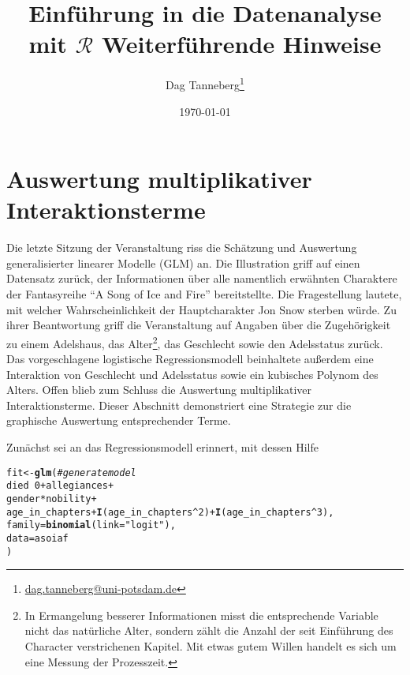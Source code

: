 \documentclass{article}\usepackage[]{graphicx}\usepackage[]{color}
\title{Einführung in die Datenanalyse mit $\mathcal{R}$\newline%
  Weiterführende Hinweise%
}
\author{
  Dag Tanneberg\thanks{
    \href{mailto:dag.tanneberg@uni-potsdam.de}{dag.tanneberg@uni-potsdam.de}
  }
}
\date{\today}
\makeatletter
\newcommand{\hlnum}[1]{\textcolor[rgb]{0.686,0.059,0.569}{#1}}%
\newcommand{\hlstr}[1]{\textcolor[rgb]{0.192,0.494,0.8}{#1}}%
\newcommand{\hlcom}[1]{\textcolor[rgb]{0.678,0.584,0.686}{\textit{#1}}}%
\newcommand{\hlopt}[1]{\textcolor[rgb]{0,0,0}{#1}}%
\newcommand{\hlstd}[1]{\textcolor[rgb]{0.345,0.345,0.345}{#1}}%
\newcommand{\hlkwb}[1]{\textcolor[rgb]{0.69,0.353,0.396}{#1}}%
\newcommand{\hlkwc}[1]{\textcolor[rgb]{0.333,0.667,0.333}{#1}}%
\newcommand{\hlkwd}[1]{\textcolor[rgb]{0.737,0.353,0.396}{\textbf{#1}}}%
\newenvironment{kframe}{%
 \def\at@end@of@kframe{}%
 \ifinner\ifhmode%
  \def\at@end@of@kframe{\end{minipage}}%
  \begin{minipage}{\columnwidth}%
 \fi\fi%
 \def\FrameCommand##1{\hskip\@totalleftmargin \hskip-\fboxsep
 \colorbox{shadecolor}{##1}\hskip-\fboxsep
     \hskip-\linewidth \hskip-\@totalleftmargin \hskip\columnwidth}%
 \MakeFramed {\advance\hsize-\width
   \@totalleftmargin\z@ \linewidth\hsize
   \@setminipage}}%
 {\par\unskip\endMakeFramed%
 \at@end@of@kframe}
\newenvironment{knitrout}{}{} %
\makeatother
\begin{document}
\maketitle



\section{Auswertung multiplikativer Interaktionsterme}

Die letzte Sitzung der Veranstaltung riss die Schätzung und
Auswertung generalisierter linearer Modelle (GLM) an. Die
Illustration griff auf einen Datensatz zurück, der Informationen
über alle namentlich erwähnten Charaktere der Fantasyreihe ``A
Song of Ice and Fire'' bereitstellte. Die Fragestellung lautete,
mit welcher Wahrscheinlichkeit der Hauptcharakter Jon Snow sterben
würde. Zu ihrer Beantwortung griff die Veranstaltung auf Angaben
über die Zugehörigkeit zu einem Adelshaus, das Alter\footnote{
  In Ermangelung besserer Informationen misst die entsprechende
  Variable nicht das natürliche Alter, sondern zählt die Anzahl
  der seit Einführung des Character verstrichenen Kapitel. Mit
  etwas gutem Willen handelt es sich um eine Messung der
  Prozesszeit.
},
das Geschlecht sowie den Adelsstatus zurück. Das
vorgeschlagene logistische Regressionsmodell beinhaltete außerdem
eine Interaktion von Geschlecht und Adelsstatus sowie ein
kubisches Polynom des Alters. Offen blieb zum Schluss die
Auswertung multiplikativer Interaktionsterme. Dieser Abschnitt
demonstriert eine Strategie zur die graphische Auswertung
entsprechender Terme.

Zunächst sei an das Regressionsmodell erinnert, mit dessen Hilfe


\begin{knitrout}
\color{fgcolor}\begin{kframe}
\begin{alltt}
\hlstd{fit} \hlkwb{<-} \hlkwd{glm}\hlstd{(} \hlcom{# generate model}
  \hlstd{died} \hlopt{~} \hlnum{0} \hlopt{+} \hlstd{allegiances} \hlopt{+}
    \hlstd{gender}\hlopt{*}\hlstd{nobility} \hlopt{+}
    \hlstd{age_in_chapters} \hlopt{+} \hlkwd{I}\hlstd{(age_in_chapters}\hlopt{^}\hlnum{2}\hlstd{)} \hlopt{+} \hlkwd{I}\hlstd{(age_in_chapters}\hlopt{^}\hlnum{3}\hlstd{),}
  \hlkwc{family} \hlstd{=} \hlkwd{binomial}\hlstd{(}\hlkwc{link} \hlstd{=} \hlstr{"logit"}\hlstd{),}
  \hlkwc{data} \hlstd{= asoiaf}
\hlstd{)}
\end{alltt}
\end{kframe}
\end{knitrout}
\end{document}
